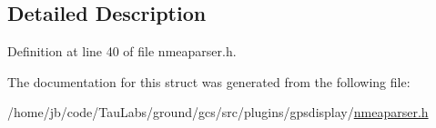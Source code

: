 \subsection{\-Detailed \-Description}


\-Definition at line 40 of file nmeaparser.\-h.



\-The documentation for this struct was generated from the following file\-:\begin{DoxyCompactItemize}
\item 
/home/jb/code/\-Tau\-Labs/ground/gcs/src/plugins/gpsdisplay/\hyperlink{nmeaparser_8h}{nmeaparser.\-h}\end{DoxyCompactItemize}
